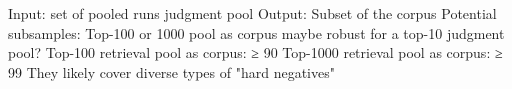 Input:
set of pooled runs
judgment pool
Output:
Subset of the corpus
Potential subsamples:
Top-100 or 1000 pool as corpus maybe robust for a top-10 judgment pool?
Top-100 retrieval pool as corpus: ≥ 90%
Top-1000 retrieval pool as corpus: ≥ 99%
They likely cover diverse types of "hard negatives"
